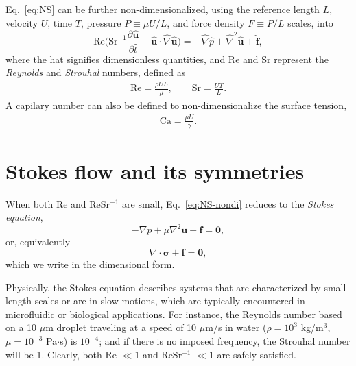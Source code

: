 Eq.\ \eqref{eq:NS} can be further non-dimensionalized, using the reference length $L$, velocity $U$, time $T$, pressure $P \equiv \mu U/L$, and force density $F \equiv P/L$ scales, into
\begin{equation}
   \textrm{Re} \bigg(\textrm{Sr}^{-1} \frac{\partial \hat{\bm u}}{\partial \hat{t}} + \hat{\bm u} \cdot \hat{\nabla} \hat{\bm u} \bigg) =
   -\hat{\nabla} \hat{p} + \hat{\nabla} ^2  \hat{\bm u} + \hat{\bm f},
  \label{eq:NS-nondi}
\end{equation}
where the hat signifies dimensionless quantities, and Re and Sr represent the \emph{Reynolds} and \emph{Strouhal} numbers, defined as
\begin{equation}
  \begin{aligned}
    \textrm{Re} = \frac{\rho UL}{\mu},\quad \quad \textrm{Sr} = \frac{UT}{L}.
  \end{aligned}
\end{equation}
A capilary number can also be defined to non-dimensionalize the surface tension,
\begin{equation}
  \begin{aligned}
    \textrm{Ca} = \frac{\mu U}{\gamma}.
  \end{aligned}
\end{equation}




\section{Stokes flow and its symmetries}

When both Re and ReSr$^{-1}$ are small, Eq.\ \eqref{eq:NS-nondi} reduces to the \emph{Stokes equation},
\begin{equation}
   -\nabla p + \mu \nabla ^2  {\bm u} + {\bm f} = {\bm 0},
 \label{eq:Stokes}
\end{equation}
or, equivalently
\begin{equation}
   \nabla \cdot  {\bm \sigma} + {\bm f} = {\bm 0},
 \label{eq:Stokes1}
\end{equation}
which we write in the dimensional form.

Physically, the Stokes equation describes systems that are characterized by small length scales or are in slow motions, which are typically encountered in microfluidic or biological applications.
For instance, the Reynolds number based on a 10 $\mu$m droplet traveling at a speed of 10 $\mu$m/s in water ($\rho=10^3$ kg/m$^{3}$, $\mu=10^{-3}$ Pa$\cdot$s) is $10^{-4}$;
and if there is no imposed frequency, the Strouhal number will be 1.
Clearly, both Re $\ll 1$ and ReSr$^{-1}$ $\ll 1$ are safely satisfied.

